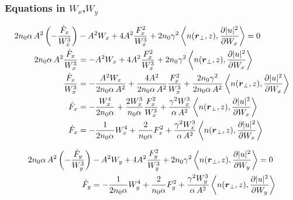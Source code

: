 \subsubsection{Equations in $W_x$,$W_y$}

\begin{equation}
\begin{split}
     2 n_0 \alpha\, A^2 \left(  -\frac{\dot{F}_{x} }{W_{x}^3} \right)  &- A^2 W_x + 4 A^2 \frac{F_{x}^2}{W_{x}^3}  + 2n_0 \gamma^2 \left<n(\mbox{\boldmath{$r$}}_{\perp},z), \frac{\partial |u|^2}{\partial W_{x}}\right> = 0 \\
     2 n_0 \alpha\, A^2 \frac{\dot{F}_{x} }{W_{x}^3}  &=   - A^2 W_x + 4 A^2 \frac{F_{x}^2}{W_{x}^3}  + 2n_0 \gamma^2 \left<n(\mbox{\boldmath{$r$}}_{\perp},z), \frac{\partial |u|^2}{\partial W_{x}}\right>  \\
     \frac{\dot{F}_{x} }{W_{x}^3}  &=   - \frac{A^2 W_x}{2 n_0 \alpha\, A^2} + \frac{4 A^2 }{2 n_0 \alpha\, A^2} \frac{F_{x}^2}{W_{x}^3}  + \frac{2n_0 \gamma^2}{2 n_0 \alpha\, A^2}  \left<n(\mbox{\boldmath{$r$}}_{\perp},z), \frac{\partial |u|^2}{\partial W_{x}}\right> \\
     \dot{F}_{x}  &=   - \frac{W_{x}^4}{2 n_0 \alpha} + \frac{2 W_{x}^3}{n_0 \alpha} \frac{F_{x}^2}{W_{x}^3}  + \frac{\gamma^2 W_{x}^3}{ \alpha\, A^2}  \left<n(\mbox{\boldmath{$r$}}_{\perp},z), \frac{\partial |u|^2}{\partial W_{x}}\right> \\ 
     \dot{F}_{x}  &=   - \frac{1}{2 n_0 \alpha} W_{x}^4+ \frac{2}{n_0 \alpha} F_{x}^2  + \frac{\gamma^2 W_{x}^3}{ \alpha\, A^2}  \left<n(\mbox{\boldmath{$r$}}_{\perp},z), \frac{\partial |u|^2}{\partial W_{x}}\right> \\    
\end{split}
\end{equation}

\begin{equation}
\begin{split}
    2 n_0 \alpha\, A^2 \left(  -\frac{\dot{F}_{y} }{W_{y}^3} \right) & - A^2 W_y + 4 A^2 \frac{F_{y}^2}{W_{y}^3}  + 2n_0 \gamma^2 \left<n(\mbox{\boldmath{$r$}}_{\perp},z), \frac{\partial |u|^2}{\partial W_{y}}\right>= 0 \\
         \dot{F}_{y}  &=   - \frac{1}{2 n_0 \alpha} W_{y}^4 + \frac{2}{n_0 \alpha} F_{y}^2  + \frac{\gamma^2 W_{y}^3}{ \alpha\, A^2}  \left<n(\mbox{\boldmath{$r$}}_{\perp},z), \frac{\partial |u|^2}{\partial W_{y}}\right> \\
\end{split}
\end{equation}

